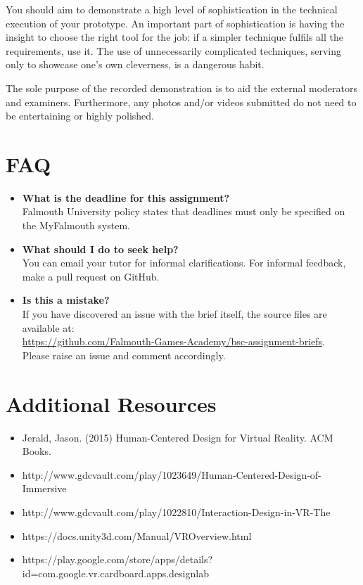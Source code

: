 \documentclass{../../fal_assignment}
\begin{document}
You should aim to demonstrate a high level of sophistication in the technical execution of your prototype. An important part of sophistication is having the insight to choose the right tool for the job: if a simpler technique fulfils all the requirements, use it. The use of unnecessarily complicated techniques, serving only to showcase one's own cleverness, is a dangerous habit. 

The sole purpose of the recorded demonstration is to aid the external moderators and examiners. Furthermore, any photos and/or videos submitted do not need to be entertaining or highly polished.

\section*{FAQ}

\begin{itemize}
	\item 	\textbf{What is the deadline for this assignment?} \\ 
    		Falmouth University policy states that deadlines must only be specified on the MyFalmouth system.
    		
	\item 	\textbf{What should I do to seek help?} \\ 
    		You can email your tutor for informal clarifications. For informal feedback, make a pull request on GitHub. 
    		
    	\item 	\textbf{Is this a mistake?} \\ 	
    		If you have discovered an issue with the brief itself, the source files are available at: \\
    		\url{https://github.com/Falmouth-Games-Academy/bsc-assignment-briefs}.\\
    		 Please raise an issue and comment accordingly.
\end{itemize}

\section*{Additional Resources}

\begin{itemize}
    \item Jerald, Jason. (2015) Human-Centered Design for Virtual Reality. ACM Books.
    \item http://www.gdcvault.com/play/1023649/Human-Centered-Design-of-Immersive 
    \item http://www.gdcvault.com/play/1022810/Interaction-Design-in-VR-The
    \item https://docs.unity3d.com/Manual/VROverview.html
    \item https://play.google.com/store/apps/details?id=com.google.vr.cardboard.apps.designlab
    
\end{itemize}
\end{document}
